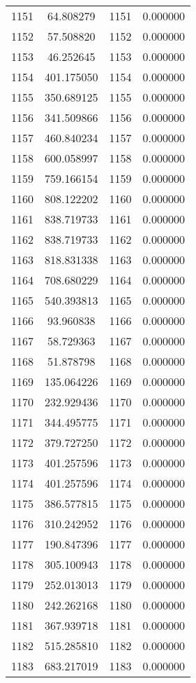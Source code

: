 \documentclass[12pt]{article}
\begin{document}
\begin{longtable}{@{}cccc@{}}
1151 & 64.808279 & 1151 & 0.000000 \\
1152 & 57.508820 & 1152 & 0.000000 \\
1153 & 46.252645 & 1153 & 0.000000 \\
1154 & 401.175050 & 1154 & 0.000000 \\
1155 & 350.689125 & 1155 & 0.000000 \\
1156 & 341.509866 & 1156 & 0.000000 \\
1157 & 460.840234 & 1157 & 0.000000 \\
1158 & 600.058997 & 1158 & 0.000000 \\
1159 & 759.166154 & 1159 & 0.000000 \\
1160 & 808.122202 & 1160 & 0.000000 \\
1161 & 838.719733 & 1161 & 0.000000 \\
1162 & 838.719733 & 1162 & 0.000000 \\
1163 & 818.831338 & 1163 & 0.000000 \\
1164 & 708.680229 & 1164 & 0.000000 \\
1165 & 540.393813 & 1165 & 0.000000 \\
1166 & 93.960838 & 1166 & 0.000000 \\
1167 & 58.729363 & 1167 & 0.000000 \\
1168 & 51.878798 & 1168 & 0.000000 \\
1169 & 135.064226 & 1169 & 0.000000 \\
1170 & 232.929436 & 1170 & 0.000000 \\
1171 & 344.495775 & 1171 & 0.000000 \\
1172 & 379.727250 & 1172 & 0.000000 \\
1173 & 401.257596 & 1173 & 0.000000 \\
1174 & 401.257596 & 1174 & 0.000000 \\
1175 & 386.577815 & 1175 & 0.000000 \\
1176 & 310.242952 & 1176 & 0.000000 \\
1177 & 190.847396 & 1177 & 0.000000 \\
1178 & 305.100943 & 1178 & 0.000000 \\
1179 & 252.013013 & 1179 & 0.000000 \\
1180 & 242.262168 & 1180 & 0.000000 \\
1181 & 367.939718 & 1181 & 0.000000 \\
1182 & 515.285810 & 1182 & 0.000000 \\
1183 & 683.217019 & 1183 & 0.000000 \\

\end{longtable}
\end{document}
